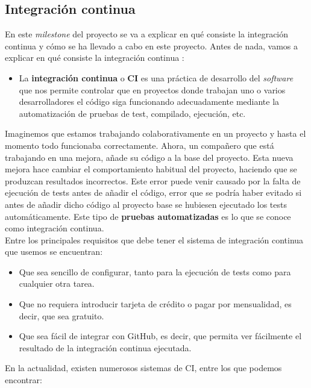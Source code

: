 \subsection{Integración continua}
En este \textit{milestone} del proyecto se va a explicar en qué consiste la integración
continua y cómo se ha llevado a cabo en este proyecto. Antes de nada, vamos a explicar en
qué consiste la integración continua \cite{continuous-integration}:

    \begin{itemize}
        \item La \textbf{integración continua} o \textbf{CI} es una práctica de desarrollo
        del \textit{software} que nos permite controlar que en proyectos donde trabajan uno
        o varios desarrolladores el código siga funcionando adecuadamente mediante la
        automatización de pruebas de test, compilado, ejecución, etc.
    \end{itemize}

Imaginemos que estamos trabajando colaborativamente en un proyecto y hasta el momento todo
funcionaba correctamente. Ahora, un compañero que está trabajando en una mejora, añade su
código a la base del proyecto. Esta nueva mejora hace cambiar el comportamiento habitual del
proyecto, haciendo que se produzcan resultados incorrectos. Este error puede venir causado
por la falta de ejecución de tests antes de añadir el código, error que se podría haber
evitado si antes de añadir dicho código al proyecto base se hubiesen ejecutado los tests
automáticamente. Este tipo de \textbf{pruebas automatizadas} es lo que se conoce como
integración continua.\\

\newpage Entre los principales requisitos que debe tener el sistema de integración continua que
usemos se encuentran:

    \begin{itemize}
        \item Que sea sencillo de configurar, tanto para la ejecución de tests como para
        cualquier otra tarea.
        \item Que no requiera introducir tarjeta de crédito o pagar por mensualidad, es
        decir, que sea gratuito.
        \item Que sea fácil de integrar con GitHub, es decir, que permita ver fácilmente el
        resultado de la integración continua ejecutada.
    \end{itemize}

En la actualidad, existen numerosos sistemas de CI, entre los que podemos encontrar:

